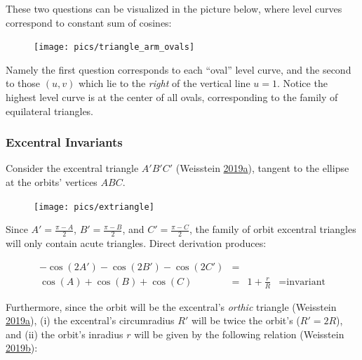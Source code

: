 \documentclass[]{article}
\begin{document}
These two questions can be visualized in the picture below, where level curves correspond to constant sum of cosines:

\begin{figure}[H]

{\centering \texttt{[image: pics/triangle\_arm\_ovals]} 

}

\end{figure}

Namely the first question corresponds to each ``oval'' level curve, and the second to those \((u,v)\) which lie to the \emph{right} of the vertical line \(u=1\). Notice the highest level curve is at the center of all ovals, corresponding to the family of equilateral triangles.

\hypertarget{excentral-invariants}{%
\subsubsection{Excentral Invariants}\label{excentral-invariants}}

Consider the excentral triangle \(A'B'C'\) (Weisstein \protect\hyperlink{ref-mw}{2019}\protect\hyperlink{ref-mw}{a}), tangent to the ellipse at the orbits' vertices \(ABC\).

\begin{figure}[H]

{\centering \texttt{[image: pics/extriangle]} 

}

\end{figure}

Since \(A'=\frac{\pi-A}{2}\), \(B'=\frac{\pi-B}{2}\), and \(C'=\frac{\pi-C}{2}\), the family of orbit excentral triangles will only contain acute triangles. Direct derivation produces:

\[
\begin{array}{rcll}
-\cos(2A')-\cos(2B')-\cos(2C') & = & \\ \cos(A)+\cos(B)+\cos(C) & = & 1+\frac{r}{R} & = \text{invariant}
\end{array}
\]

Furthermore, since the orbit will be the excentral's \emph{orthic} triangle (Weisstein \protect\hyperlink{ref-mw}{2019}\protect\hyperlink{ref-mw}{a}), (i) the excentral's circumradius \(R'\) will be twice the orbit's (\(R'=2R\)), and (ii) the orbit's inradius \(r\) will be given by the following relation (Weisstein \protect\hyperlink{ref-mw_orthic}{2019}\protect\hyperlink{ref-mw_orthic}{b}):
\end{document}
